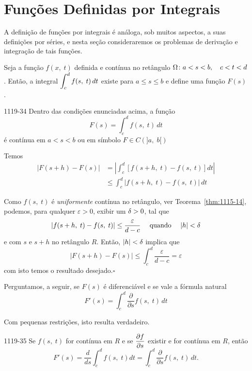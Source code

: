 \chapter{Funções Definidas por Integrais}

 A definição de funções por integrais é análoga, sob muitos aspectos, a suas definições
por séries, e nesta seção consideraremos os problemas de derivação
e integração de tais funções.

Seja a função $f(x,\; t)$ definida e contínua no retângulo $\Omega
\colon a < s < b,\quad c < t < d$. Então, a integral
$\displaystyle{\int_c^d f(s,\; t)\, dt}$ existe para $a \leq s \leq b$ e define
uma função $F(s)$.

\begin{theoc}{}{1119-34} Dentro das condições enunciadas acima, a
função
 \begin{equation*}
    F(s) =\int_c^d f(s,\; t)\,dt
 \end{equation*}
é contínua em $a < s < b$ ou em símbolo \(F\in C(]a,\; b[)\)
\end{theoc}

\prova Temos
\begin{align*}
|F(s+h)-F(s)|&=\left|\int_c^d[ f(s+h,\; t)-f(s,\; t)]dt \right| \\[2ex]
   & \leq \int_c^d |f(s+h,\; t)-f(s,\;t)|\,dt
\end{align*}

Como $f(s,\; t)$ é \textit{uniformente} contínua no retângulo, ver
Teorema~\ref{thm:1115-14}, podemos, para qualquer $\varepsilon>0$,
exibir um $\delta>0$, tal que
\begin{equation*}
  |f(s+h,\; t)-f(s,\; t)|\leq \frac{\varepsilon}{d-c}\quad \text{ quando }
  \quad |h|<\delta
\end{equation*}
e com $s$ e $s+h$ no retângulo $R$. Então, $|h|<\delta$ implica que
\begin{equation*}
  |F(s+h)-F(s)|\leq \int_c^d\frac{\varepsilon}{d-c}=\varepsilon
\end{equation*}
com isto temos o resultado desejado.\hfill $\square$

Perguntamos, a seguir, se $F(s)$ é diferenciável e se vale a
fórmula natural
\begin{equation*}
 F'(s)=\int_c^d \frac{\partial}{\partial s}f(s,\; t)\, dt
\end{equation*}

Com pequenas restrições, isto resulta verdadeiro.

\begin{theoc}{}{1119-35}
Se $f(s,\; t)$ for contínua em $R$ e se $\displaystyle{\frac{\partial f
}{\partial s}}$ existir e for contínua em $R$, então
\begin{equation*}
F'(s) =\frac{d}{ds}\int_c^d f(s,\; t) dt=\int_c^d \frac{\partial}{\partial s}f(s,\; t)\, dt.
\end{equation*}
\end{theoc}

